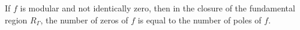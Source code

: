 If $f$ is modular and not identically zero, then in the closure of the fundamental region $R_{\Gamma}$, the number of zeros of $f$ is equal to the number of poles of $f$.
